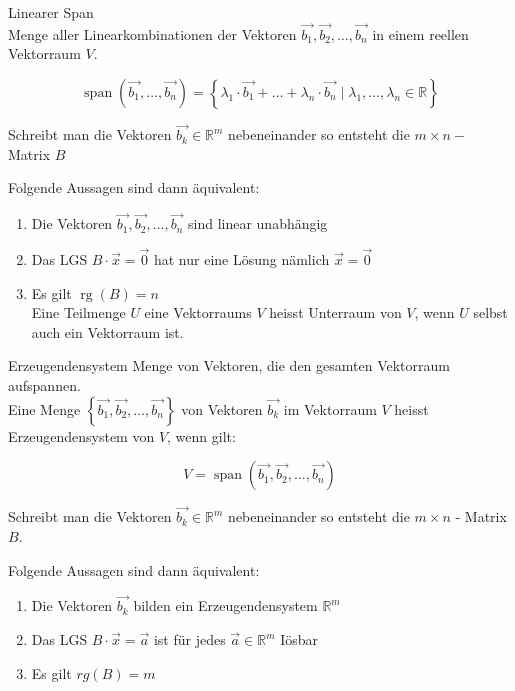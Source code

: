 \begin{definition}{Linearer Span}\\
    Menge aller Linearkombinationen der Vektoren $\overrightarrow{b_{1}}, \overrightarrow{b_{2}}, \ldots, \overrightarrow{b_{n}}$ in einem reellen Vektorraum $V$.

    $$
    \operatorname{span}\left(\overrightarrow{b_{1}}, \ldots, \overrightarrow{b_{n}}\right)=\left\{\lambda_{1} \cdot \overrightarrow{b_{1}}+ \ldots +\lambda_{n} \cdot \overrightarrow{b_{n}} \mid \lambda_{1}, \ldots, \lambda_{n} \in \mathbb{R}\right\}
    $$

    Schreibt man die Vektoren $\overrightarrow{b_{k}} \in \mathbb{R}^{m}$ nebeneinander so entsteht die $m \times n-$ Matrix $B$

    Folgende Aussagen sind dann äquivalent:

    \begin{enumerate}
    \item Die Vektoren $\overrightarrow{b_{1}}, \overrightarrow{b_{2}}, \ldots, \overrightarrow{b_{n}}$ sind linear unabhängig

    \item Das LGS $B \cdot \vec{x}=\overrightarrow{0}$ hat nur eine Lösung nämlich $\vec{x}=\overrightarrow{0}$

    \item Es gilt $\operatorname{rg}(B)=n$\\
    Eine Teilmenge $U$ eine Vektorraums $V$ heisst Unterraum von $V$, wenn $U$ selbst auch ein Vektorraum ist.

    \end{enumerate}
\end{definition}

\begin{concept}{Erzeugendensystem}
    Menge von Vektoren, die den gesamten Vektorraum aufspannen.\\
    Eine Menge $\left\{\overrightarrow{b_{1}}, \overrightarrow{b_{2}}, \ldots, \overrightarrow{b_{n}}\right\}$ von Vektoren $\overrightarrow{b_{k}}$ im Vektorraum $V$ heisst Erzeugendensystem von $V$, wenn gilt:

    $$
    V=\operatorname{span}\left(\overrightarrow{b_{1}}, \overrightarrow{b_{2}}, \ldots, \overrightarrow{b_{n}}\right)
    $$

    Schreibt man die Vektoren $\overrightarrow{b_{k}} \in \mathbb{R}^{m}$ nebeneinander so entsteht die $m \times n$ - Matrix $B$.

    Folgende Aussagen sind dann äquivalent:

    \begin{enumerate}
    \item Die Vektoren $\overrightarrow{b_{k}}$ bilden ein Erzeugendensystem $\mathbb{R}^{m}$

    \item Das LGS $B \cdot \vec{x}=\vec{a}$ ist für jedes $\vec{a} \in \mathbb{R}^{m}$ Iösbar

    \item Es gilt $r g(B)=m$

    \end{enumerate}
    
\end{concept}

